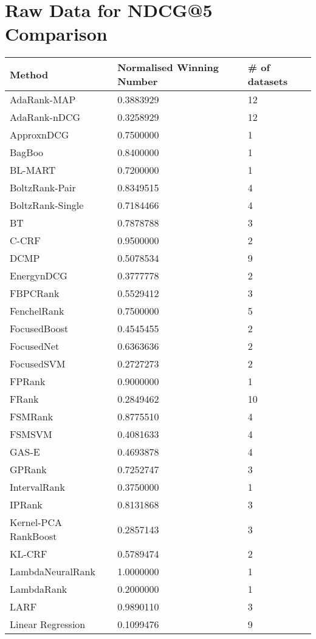 \chapter{Raw Data for NDCG@5 Comparison}
\label{app:norm_winnum_ndcg5}

\begin{longtable}{l|l|l}
Method & Normalised Winning Number & \# of datasets \\
\hline
AdaRank-\acs{MAP} & 0.3883929 & 12 \\ 
AdaRank-\acs{nDCG} & 0.3258929 & 12 \\ 
Approx\acs{nDCG} & 0.7500000 & 1 \\ 
BagBoo & 0.8400000 & 1 \\ 
BL-MART & 0.7200000 & 1 \\ 
BoltzRank-Pair & 0.8349515 & 4 \\ 
BoltzRank-Single & 0.7184466 & 4 \\ 
BT & 0.7878788 & 3 \\ 
C-\acs{CRF} & 0.9500000 & 2 \\ 
DCMP & 0.5078534 & 9 \\ 
Energy\ac{nDCG} & 0.3777778 & 2 \\ 
FBPCRank & 0.5529412 & 3 \\ 
FenchelRank & 0.7500000 & 5 \\ 
FocusedBoost & 0.4545455 & 2 \\ 
FocusedNet & 0.6363636 & 2 \\ 
Focused\acs{SVM} & 0.2727273 & 2 \\ 
FPRank & 0.9000000 & 1 \\ 
FRank & 0.2849462 & 10 \\ 
FSMRank & 0.8775510 & 4 \\ 
FSM\acs{SVM} & 0.4081633 & 4 \\ 
GAS-E & 0.4693878 & 4 \\ 
\acs{GPRank} & 0.7252747 & 3 \\ 
IntervalRank & 0.3750000 & 1 \\ 
\acs{IP}Rank & 0.8131868 & 3 \\ 
Kernel-\acs{PCA} RankBoost & 0.2857143 & 3 \\ 
KL-\acs{CRF} & 0.5789474 & 2 \\ 
LambdaNeuralRank & 1.0000000 & 1 \\ 
LambdaRank & 0.2000000 & 1 \\ 
LARF & 0.9890110 & 3 \\ 
Linear Regression & 0.1099476 & 9 \\ 

\end{longtable}
